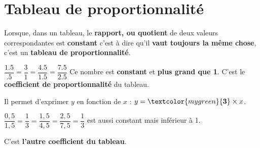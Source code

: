 \section{Tableau de proportionnalité}
\begin{definition}
   Lorsque, dans un tableau, le \textbf{rapport, ou quotient} de deux valeurs correspondantes est \textbf{constant} c'est à dire qu'il \textbf{vaut toujours la même chose}, c'est un \textbf{tableau de proportionnalité}.
\end{definition}
\begin{exemple*1}
   \begin{center}
   \end{center}

   \smallskip
   $\dfrac{\num{1.5}}{\num{.5}} =\dfrac{3}{1}=\dfrac{\num{4.5}}{\num{1.5}}=\dfrac{\num{7.5}}{\num{2.5}}$   
   Ce nombre est \textbf{constant} et \textbf{plus grand que 1}.
   C'est le \textcolor{mygreen}{\textbf{coefficient de proportionnalité}} du tableau.

   Il permet d'exprimer $y$ en fonction de $x$ : $y=\textcolor{mygreen}{\mathbf{3}}\times x$.
\end{exemple*1}

\begin{remarque}
   $\dfrac{0,5}{1,5} =\dfrac{1}{3} =\dfrac{1,5}{4,5}=\dfrac{2,5}{7,5}=\dfrac13$ est aussi constant mais inférieur à 1.

   \smallskip
   C'est \textbf{l'autre coefficient du tableau}.
\end{remarque}
